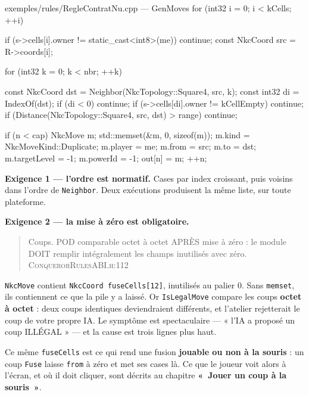 \begin{nkcode}{exemples/rules/RegleContratNu.cpp — GenMoves}
for (int32 i = 0; i < kCells; ++i) {
    if (s->cells[i].owner != static_cast<int8>(me)) continue;
    const NkcCoord src = R->coords[i];

    for (int32 k = 0; k < nbr; ++k) {
        const NkcCoord dst = Neighbor(NkcTopology::Square4, src, k);
        const int32    di  = IndexOf(dst);
        if (di < 0) continue;
        if (s->cells[di].owner != kCellEmpty) continue;
        if (Distance(NkcTopology::Square4, src, dst) > range) continue;

        if (n < cap) {
            NkcMove m;
            std::memset(&m, 0, sizeof(m));
            m.kind        = NkcMoveKind::Duplicate;
            m.player      = me;
            m.from        = src;
            m.to          = dst;
            m.targetLevel = -1;
            m.powerId     = -1;
            out[n]        = m;
        }
        ++n;
    }
}
\end{nkcode}

\textbf{Exigence 1 — l'ordre est normatif.} Cases par index croissant, puis
voisins dans l'ordre de \texttt{Neighbor}. Deux exécutions produisent la même
liste, sur toute plateforme.

\textbf{Exigence 2 — la mise à zéro est obligatoire.}

\begin{nkpiege}
\begin{quote}\small
Coups. POD comparable octet à octet APRÈS mise à zéro : le module DOIT remplir
intégralement les champs inutilisés avec zéro.
\hfill\textsc{ConquerorRulesABI.h:112}
\end{quote}

\texttt{NkcMove} contient \texttt{NkcCoord fuseCells[12]}, inutilisés au palier 0.
Sans \texttt{memset}, ils contiennent ce que la pile y a laissé. Or
\texttt{IsLegalMove} compare les coups \textbf{octet à octet} : deux coups
identiques deviendraient différents, et l'atelier rejetterait le coup de votre
propre IA. Le symptôme est spectaculaire — « l'IA a proposé un coup ILLÉGAL » —
et la cause est trois lignes plus haut.
\end{nkpiege}

Ce même \texttt{fuseCells} est ce qui rend une fusion \textbf{jouable ou non à
la souris} : un coup \texttt{Fuse} laisse \texttt{from} à zéro et met ses cases
là. Ce que le joueur voit alors à l'écran, et où il doit cliquer, sont décrits au
chapitre \textbf{«~Jouer un coup à la souris~»}.

